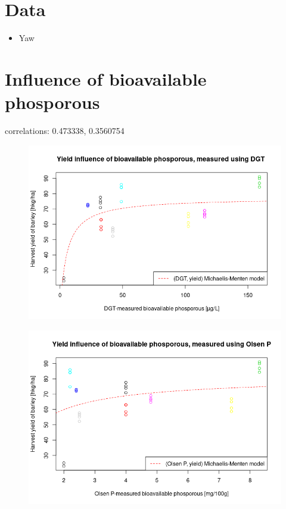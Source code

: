 \documentclass[12pt,fleqn]{article}
\title{}
\author{Asger Schultz}
\date{\today}
\begin{document}
\maketitle

\section{Data}
\begin{itemize}
	\item Yaw
\end{itemize}

\section{Influence of bioavailable phosporous}
correlations: 0.473338, 0.3560754
\begin{figure}[H]
	\centering
	\includegraphics[width=.8\linewidth]{dgt_mmm}
\end{figure}
\begin{figure}[H]
	\centering
	\includegraphics[width=.8\linewidth]{oP_mm}
\end{figure}
\end{document}
